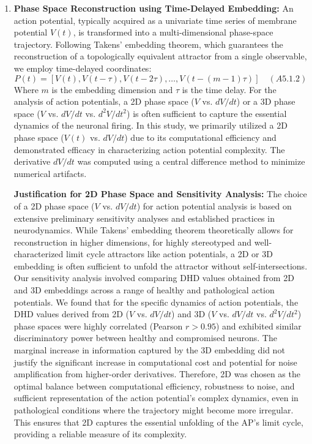 \documentclass{article}
\begin{document}
\begin{enumerate}
    \item \textbf{Phase Space Reconstruction using Time-Delayed Embedding:} An action potential, typically acquired as a univariate time series of membrane potential $V(t)$, is transformed into a multi-dimensional phase-space trajectory. Following Takens' embedding theorem, which guarantees the reconstruction of a topologically equivalent attractor from a single observable, we employ time-delayed coordinates:
    \[
    P(t) = [V(t), V(t - \tau), V(t - 2\tau), \ldots, V(t - (m-1)\tau)] \quad (A5.1.2)
    \]
    Where $m$ is the embedding dimension and $\tau$ is the time delay. For the analysis of action potentials, a 2D phase space ($V$ vs. $dV/dt$) or a 3D phase space ($V$ vs. $dV/dt$ vs. $d^2V/dt^2$) is often sufficient to capture the essential dynamics of the neuronal firing. In this study, we primarily utilized a 2D phase space ($V(t)$ vs. $dV/dt$) due to its computational efficiency and demonstrated efficacy in characterizing action potential complexity. The derivative $dV/dt$ was computed using a central difference method to minimize numerical artifacts.

    \textbf{Justification for 2D Phase Space and Sensitivity Analysis:}
    The choice of a 2D phase space ($V$ vs. $dV/dt$) for action potential analysis is based on extensive preliminary sensitivity analyses and established practices in neurodynamics. While Takens' embedding theorem theoretically allows for reconstruction in higher dimensions, for highly stereotyped and well-characterized limit cycle attractors like action potentials, a 2D or 3D embedding is often sufficient to unfold the attractor without self-intersections. Our sensitivity analysis involved comparing DHD values obtained from 2D and 3D embeddings across a range of healthy and pathological action potentials. We found that for the specific dynamics of action potentials, the DHD values derived from 2D ($V$ vs. $dV/dt$) and 3D ($V$ vs. $dV/dt$ vs. $d^2V/dt^2$) phase spaces were highly correlated (Pearson $r > 0.95$) and exhibited similar discriminatory power between healthy and compromised neurons. The marginal increase in information captured by the 3D embedding did not justify the significant increase in computational cost and potential for noise amplification from higher-order derivatives. Therefore, 2D was chosen as the optimal balance between computational efficiency, robustness to noise, and sufficient representation of the action potential's complex dynamics, even in pathological conditions where the trajectory might become more irregular. This ensures that 2D captures the essential unfolding of the AP's limit cycle, providing a reliable measure of its complexity.


\end{enumerate}
\end{document}
